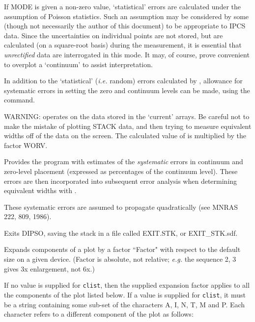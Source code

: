 \begin {description}
If MODE is given a non-zero value, `statistical' errors are calculated
under the assumption of Poisson statistics. Such an assumption may be
considered by some (though not necessarily the author of this
document) to be appropriate to IPCS data. Since the uncertainties on
individual points are not stored, but are calculated (on a square-root
basis) during the   measurement, it is essential that {\em
unrectified} data are interrogated in this mode. It may, of course,
prove convenient to overplot a `continuum' to assist interpretation.

In addition to the `statistical' ({\em i.e.} random) errors calculated
by ,  allowance for systematic errors in setting the zero and
continuum levels can be made, using the   command.

WARNING:   operates on the data stored in the `current' arrays. Be
careful not to make the mistake of plotting STACK data, and then
trying to measure equivalent widths off of the data on the screen. The
calculated value of   is multiplied by the factor WORV.

Provides the program with estimates of the {\em systematic} errors in
continuum and zero-level placement (expressed as percentages of the
continuum level). These errors are then incorporated into subsequent
error analysis when determining equivalent widths with . 

These systematic errors are assumed to propagate quadratically (see
MNRAS 222, 809, 1986).

Exits DIPSO, saving the stack in a file called EXIT.STK, or EXIT\_STK.sdf.

Expands components of a plot by a factor ``Factor" with respect to the default
size on a given device. (Factor is absolute, not relative; {\em e.g.} the
sequence   2,   3 gives 3x enlargement, not 6x.)

If no value is supplied for {\tt{clist}},  then the supplied expansion factor
applies to all the components of the plot listed below. If a value is supplied
for {\tt{clist}},  it must be a string containing some sub-set of the characters
A, I, N, T, M and P. Each character refers to a different component of the plot
as follows:


\end{description}
